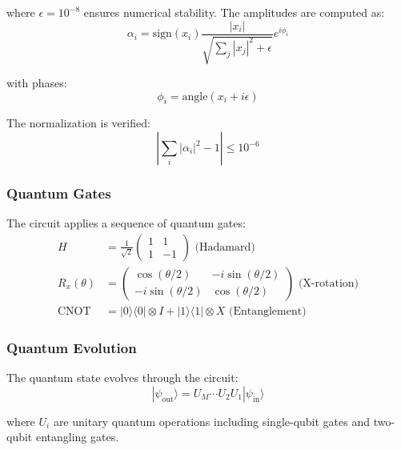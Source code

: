 \documentclass{article}
\begin{document}
where $\epsilon=10^{-8}$ ensures numerical stability. The amplitudes are computed as:
\begin{equation}
\alpha_i = \text{sign}(x_i)\frac{|x_i|}{\sqrt{\sum_j |x_j|^2 + \epsilon}}e^{i\phi_i}
\end{equation}

with phases:
\begin{equation} 
\phi_i = \text{angle}(x_i + i\epsilon)
\end{equation}

The normalization is verified:
\begin{equation}
\left|\sum_i |\alpha_i|^2 - 1\right| \leq 10^{-6}
\end{equation}

\subsubsection{Quantum Gates}
The circuit applies a sequence of quantum gates:
\begin{align*}
H &= \frac{1}{\sqrt{2}}\begin{pmatrix} 1 & 1 \\ 1 & -1 \end{pmatrix} \text{ (Hadamard)} \\
R_x(\theta) &= \begin{pmatrix} \cos(\theta/2) & -i\sin(\theta/2) \\ -i\sin(\theta/2) & \cos(\theta/2) \end{pmatrix} \text{ (X-rotation)} \\
\text{CNOT} &= |0\rangle\langle0| \otimes I + |1\rangle\langle1| \otimes X \text{ (Entanglement)}
\end{align*}

\subsubsection{Quantum Evolution}
The quantum state evolves through the circuit:
\begin{equation}
|\psi_{\text{out}}\rangle = U_M\cdots U_2U_1|\psi_{\text{in}}\rangle
\end{equation}

where $U_i$ are unitary quantum operations including single-qubit gates and two-qubit entangling gates.
\end{document}
